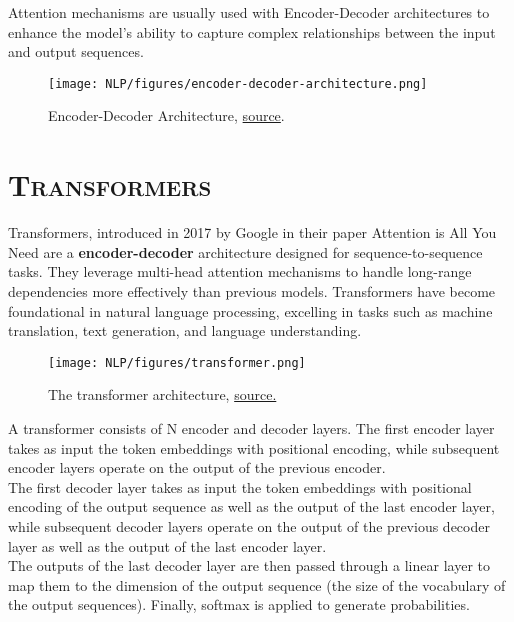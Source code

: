 \documentclass[a4paper,10pt]{article}
\begin{document}
\noindent Attention mechanisms are usually used with Encoder-Decoder architectures to enhance the model's ability to capture complex relationships between the input and output sequences.

\begin{figure}[H]
    \centering
    \texttt{[image: NLP/figures/encoder-decoder-architecture.png]}
    \caption{Encoder-Decoder Architecture, \textcolor{blue}{\href{https://vitalflux.com/encoder-decoder-architecture-neural-network/}{source}}.}
    \label{fig:enter-label}
\end{figure}

\newpage

\section{\scshape{Transformers}}

\noindent Transformers, introduced in 2017 by Google in their paper Attention is All You Need \cite{DBLP:journals/corr/VaswaniSPUJGKP17}
 are a \textbf{encoder-decoder} architecture designed for sequence-to-sequence tasks. They leverage multi-head attention mechanisms to handle long-range dependencies more effectively than previous models. Transformers have become foundational in natural language processing, excelling in tasks such as machine translation, text generation, and language understanding.

\begin{figure}[H]
    \centering
    \texttt{[image: NLP/figures/transformer.png]}
    \caption{The transformer architecture, \textcolor{blue}{\href{https://arxiv.org/pdf/1706.03762}{source.}}}
    \label{fig:enter-label}
\end{figure}

\noindent A transformer consists of N encoder and decoder layers. The first encoder layer takes as input the token embeddings with positional encoding, while subsequent encoder layers operate on the output of the previous encoder.\\

\noindent The first decoder layer takes as input the token embeddings with positional encoding of the output sequence as well as the output of the last encoder layer, while subsequent decoder layers operate on the output of the previous decoder layer as well as the output of the last encoder layer.\\

\noindent The outputs of the last decoder layer are then passed through a linear layer to map them to the dimension of the output sequence (the size of the vocabulary of the output sequences). Finally, softmax is applied to generate probabilities.
\end{document}
